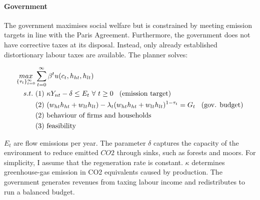 \paragraph{Government}

The government maximises social welfare but is constrained by meeting emission targets in line with the Paris Agreement. Furthermore, the government does not have corrective taxes at its disposal. Instead, only already established distortionary labour taxes are available. The planner solves:

\begin{align*}
\underset{\{\tau_{t}\}_{t=0}^{\infty}}{max}&\sum_{t=0}^{\infty}\beta^t u(c_{t}, h_{ht}, h_{lt})\\
s.t.\ %
& (1)\ \kappa Y_{nt} -\delta \leq E_t \  \forall \ t\geq 0\hspace{3mm} \text{(emission target)}\\
& (2)\ (w_{ht}h_{ht}+w_{lt}h_{lt})-\lambda_t (w_{ht}h_{ht}+w_{lt}h_{lt})^{1-\tau_{t}} = G_t\hspace{3mm} \text{(gov. budget)}\\
& (2)\ \text{behaviour of firms and households}\\
& (3)\ \text{feasibility}
\end{align*}

$E_t$ are flow emissions per year.  The parameter $\delta$ captures the capacity of the environment to reduce emitted $CO2$ through sinks, such as forests and moors.  For simplicity, I assume that the regeneration rate is constant. $\kappa$ determines greenhouse-gas emission in CO2 equivalents caused by production. %
The government generates revenues from taxing labour income and redistributes to run a balanced budget. 



